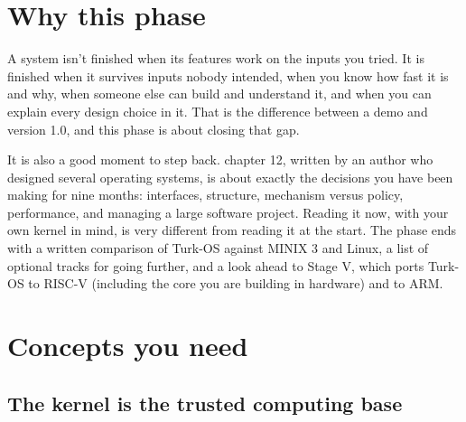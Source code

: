 \documentclass[11pt,a4paper]{article}
\begin{document}


\section{Why this phase}

A system isn't finished when its features work on the inputs you tried. It is finished when it survives inputs
nobody intended, when you know how fast it is and why, when someone else can build and understand it, and when you
can explain every design choice in it. That is the difference between a demo and version 1.0, and this phase is about
closing that gap.

It is also a good moment to step back. \MOS chapter 12, written by an author who designed several operating systems,
is about exactly the decisions you have been making for nine months: interfaces, structure, mechanism versus policy,
performance, and managing a large software project. Reading it now, with your own kernel in mind, is very different
from reading it at the start. The phase ends with a written comparison of Turk-OS against MINIX 3 and Linux, a list
of optional tracks for going further, and a look ahead to Stage V, which ports Turk-OS to RISC-V (including the core
you are building in hardware) and to ARM.

\section{Concepts you need}

\subsection{The kernel is the trusted computing base}
\end{document}
